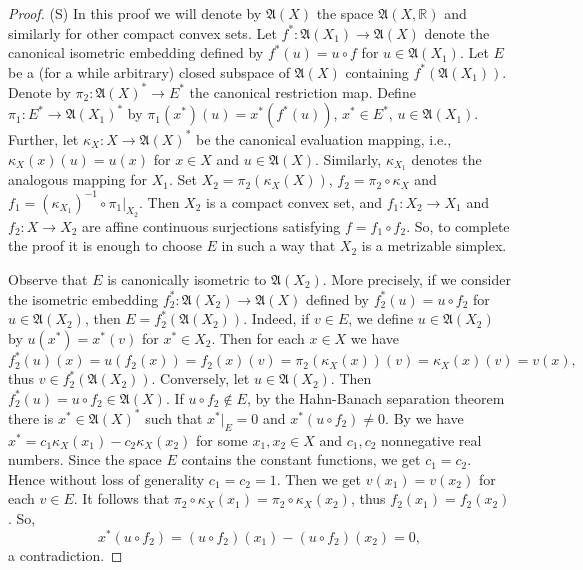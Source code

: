 \documentclass{amsart}
\numberwithin{equation}{section}
\theoremstyle{definition}
\def\fra{\mathfrak{A}}
\def\er{\mathbb R}
\def\r{|}
\begin{document}
\begin{proof} (S) In this proof we will denote by $\fra(X)$ the space $\fra(X,\er)$ and similarly for other compact convex sets.
Let $f^*\colon\fra(X_1)\to\fra(X)$ denote the canonical isometric embedding defined by $f^*(u)=u\circ f$ for $u\in\fra(X_1)$. Let $E$ be a (for a while arbitrary) closed subspace of $\fra(X)$ containing $f^*(\fra(X_1))$. Denote by  $\pi_2:\fra(X)^*\to E^*$ the canonical restriction map. Define $\pi_1:E^*\to \fra(X_1)^*$ by $\pi_1(x^*)(u)=x^*(f^*(u))$, $x^*\in E^*$, $u\in\fra(X_1)$. 
Further, let $\kappa_X:X\to\fra(X)^*$ be the canonical evaluation mapping, i.e., $\kappa_X(x)(u)=u(x)$ for $x\in X$ and $u\in\fra(X)$. Similarly, $\kappa_{X_1}$ denotes the analogous mapping for $X_1$. Set $X_2=\pi_2(\kappa_{X}(X))$, $f_2=\pi_2\circ\kappa_X$ and $f_1=(\kappa_{X_1})^{-1}\circ \pi_1\r_{X_2}$. Then $X_2$ is a compact convex set, and $f_1:X_2\to X_1$ and $f_2:X\to X_2$ are affine continuous surjections satisfying $f=f_1\circ f_2$. So, to complete the proof it is enough to choose $E$ in such a way that $X_2$ is a metrizable simplex.

Observe that $E$ is canonically isometric to $\fra(X_2)$. More precisely, if we consider the isometric embedding $f_2^*\colon \fra(X_2)\to\fra(X)$
defined by $f_2^*(u)=u\circ f_2$ for $u\in\fra(X_2)$, then $E=f_2^*(\fra(X_2))$. Indeed, if $v\in E$, we define $u\in\fra(X_2)$ by $u(x^*)=x^*(v)$ for $x^*\in X_2$. Then for each $x\in X$ we have
$$f_2^*(u)(x)=u(f_2(x))=f_2(x)(v)=\pi_2(\kappa_X(x))(v)=\kappa_X(x)(v)=v(x),$$
thus $v\in f_2^*(\fra(X_2))$. Conversely, let $u\in \fra(X_2)$. Then $f_2^*(u)=u\circ f_2\in\fra(X)$. If $u\circ f_2\notin E$, by the Hahn-Banach separation theorem there is $x^*\in \fra(X)^*$ such that $x^*\r_{E}=0$ and $x^*(u\circ f_2)\ne 0$. By \cite[Proposition 4.31(a,b)]{lmns} we have $x^*=c_1\kappa_X(x_1)-c_2\kappa_X(x_2)$ for some $x_1,x_2\in X$ and $c_1,c_2$ nonnegative real numbers. Since the space $E$ contains the constant functions, we get $c_1=c_2$. Hence without loss of generality $c_1=c_2=1$. Then we get $v(x_1)=v(x_2)$ for each $v\in E$. It follows that $\pi_2\circ\kappa_X(x_1)=\pi_2\circ\kappa_X(x_2)$, thus $f_2(x_1)=f_2(x_2)$. So,
$$x^*(u\circ f_2)=(u\circ f_2)(x_1)-(u\circ f_2)(x_2)=0,$$
a contradiction.


\end{proof}
\end{document}
